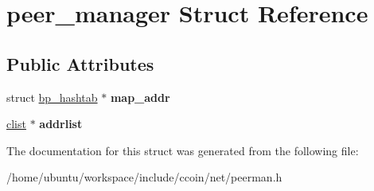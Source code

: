 \hypertarget{structpeer__manager}{\section{peer\-\_\-manager Struct Reference}
\label{structpeer__manager}
}
\subsection*{Public Attributes}
\begin{DoxyCompactItemize}
\item 
\hypertarget{structpeer__manager_aa243b23362d7f47096ca83b3fd9a244d}{struct \hyperlink{structbp__hashtab}{bp\-\_\-hashtab} $\ast$ {\bfseries map\-\_\-addr}}\label{structpeer__manager_aa243b23362d7f47096ca83b3fd9a244d}

\item 
\hypertarget{structpeer__manager_a7e856c674bbb63b009b3a1f78744b0e6}{\hyperlink{structclist}{clist} $\ast$ {\bfseries addrlist}}\label{structpeer__manager_a7e856c674bbb63b009b3a1f78744b0e6}

\end{DoxyCompactItemize}


The documentation for this struct was generated from the following file\-:\begin{DoxyCompactItemize}
\item 
/home/ubuntu/workspace/include/ccoin/net/peerman.\-h\end{DoxyCompactItemize}
